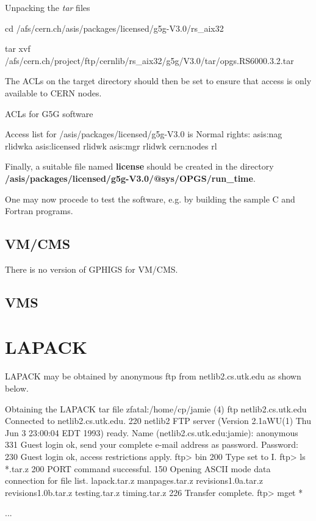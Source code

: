 \begin{XMPt}{Unpacking the {\it tar} files}

cd /afs/cern.ch/asis/packages/licensed/g5g-V3.0/rs_aix32

tar xvf /afs/cern.ch/project/ftp/cernlib/rs_aix32/g5g/V3.0/tar/opgs.RS6000.3.2.tar

\end{XMPt}

The ACLs on the target directory should then be set to ensure that access
is only available to CERN nodes.

\begin{XMPt}{ACLs for G5G software}

Access list for /asis/packages/licensed/g5g-V3.0 is
Normal rights:
  asis:nag rlidwka
  asis:licensed rlidwk
  asis:mgr rlidwk
  cern:nodes rl

\end{XMPt}

Finally, a suitable file named {\bf license} should be created
in the directory {\bf /asis/packages/licensed/g5g-V3.0/@sys/OPGS/run\_time}.

One may now procede to test the software, e.g. by building the sample C and
Fortran programs.

\subsection{VM/CMS}

There is no version of GPHIGS for VM/CMS.

\subsection{VMS}

\section{LAPACK}

\label{sect-LAPACK}

LAPACK may be obtained by anonymous ftp from 
netlib2.cs.utk.edu as shown below.

\begin{XMPt}{Obtaining the LAPACK tar file}
zfatal:/home/cp/jamie (4) ftp netlib2.cs.utk.edu
Connected to netlib2.cs.utk.edu.
220 netlib2 FTP server (Version 2.1aWU(1) Thu Jun 3 23:00:04 EDT 1993) ready.
Name (netlib2.cs.utk.edu:jamie): anonymous
331 Guest login ok, send your complete e-mail address as password.
Password:
230 Guest login ok, access restrictions apply.
ftp> bin
200 Type set to I.
ftp> ls *.tar.z
200 PORT command successful.
150 Opening ASCII mode data connection for file list.
lapack.tar.z
manpages.tar.z
revisions1.0a.tar.z
revisions1.0b.tar.z
testing.tar.z
timing.tar.z
226 Transfer complete.
ftp> mget *

...

\end{XMPt}

